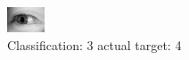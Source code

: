 \begin{figure}[h!]
\begin{center}
\includegraphics[width=0.60\columnwidth]{figures/ID3103_class_3_target_4.png}
\end{center}
\caption{ Classification: 3 actual target: 4}
\label{fig:ID3103_class_3_target_4}
\end{figure}
